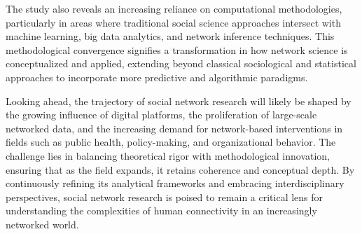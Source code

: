 \documentclass[twocolumn]{article}
\begin{document}
		The study also reveals an increasing reliance on computational methodologies, particularly in areas where traditional social science approaches intersect with machine learning, big data analytics, and network inference techniques. This methodological convergence signifies a transformation in how network science is conceptualized and applied, extending beyond classical sociological and statistical approaches to incorporate more predictive and algorithmic paradigms.
		
		Looking ahead, the trajectory of social network research will likely be shaped by the growing influence of digital platforms, the proliferation of large-scale networked data, and the increasing demand for network-based interventions in fields such as public health, policy-making, and organizational behavior. The challenge lies in balancing theoretical rigor with methodological innovation, ensuring that as the field expands, it retains coherence and conceptual depth. By continuously refining its analytical frameworks and embracing interdisciplinary perspectives, social network research is poised to remain a critical lens for understanding the complexities of human connectivity in an increasingly networked world.
		
		
		
	
	
	
\end{document}
